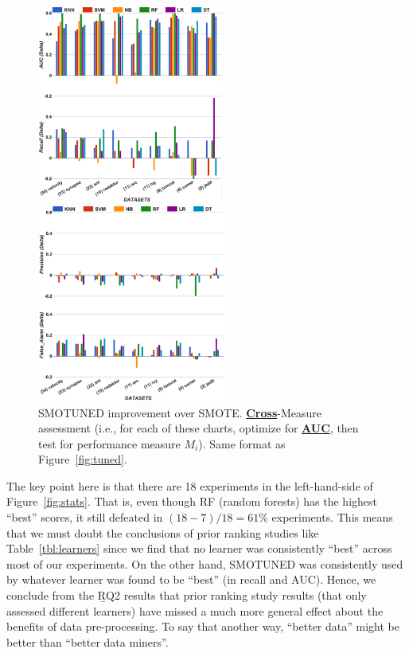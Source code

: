 \documentclass[sigconf,review, anonymous]{acmart}
\theoremstyle{break}
\theoremstyle{break}
\newcommand{\smb}{{\sc SMOTUNED}}
\begin{document}
\begin{figure}[!t]
\begin{minipage}{.5\linewidth}
\centering
        \includegraphics[width=.95\linewidth,height=6.5cm]{./fig/AUC_auc1.png}
    \end{minipage}%
\begin{minipage}{.5\linewidth}
        \centering
        \includegraphics[width=.95\linewidth,height=6.5cm]{./fig/AUC_prec.png}
    \end{minipage}%
    
    \caption{ SMOTUNED improvement over SMOTE. 
    \underline{{\bf Cross}}-Measure
    assessment (i.e., for each of these charts,
    optimize for \underline{{\bf AUC}}, then test for
    performance measure $M_i$).  Same format as
    Figure~\ref{fig:tuned}.}
    \label{fig:auc22}
\end{figure} 

The key point here is that there are 18 experiments in the left-hand-side of Figure~\ref{fig:stats}. That is,
even though RF (random forests) has the highest  ``best'' scores, it still defeated in \mbox{$(18-7)/18=61\%$}
experiments. This means that we must doubt the conclusions of prior ranking studies like 
 Table~\ref{tbl:learners} since we find that no   learner was  consistently  ``best''  across most of our experiments.
On the other hand, 
  {\smb} was  consistently  used  by  whatever  learner  was  found  to  be ``best'' (in recall and AUC). 
Hence, we conclude from the {\b RQ2} results that  prior ranking study results (that only assessed different learners) have missed a much more general effect about the benefits of data pre-processing.
To say that another way, ``better data'' might be better than ``better data miners''.
\end{document}
